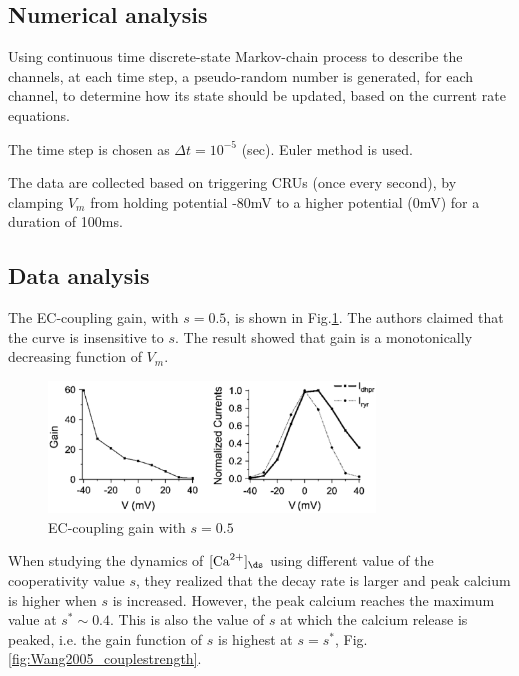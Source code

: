 \subsection{Numerical analysis}

Using continuous time discrete-state Markov-chain process to describe the
channels, at each time step, a pseudo-random number is generated, for each
channel, to determine how its state should be updated, based on the current rate
equations. 

The time step is chosen as $\Delta t=10^{-5}$ (sec). Euler method is used. 

The data are collected based on triggering CRUs (once every second), by clamping
$V_m$ from holding potential -80mV to a higher potential (0mV) for a duration of
100ms. 

\subsection{Data analysis}

The EC-coupling gain, with $s=0.5$, is shown in Fig.\ref{fig:Wang2005_ECgain}.
The authors claimed that the curve is insensitive to $s$. The result showed that
gain is a monotonically decreasing function of $V_m$.

\begin{figure}[hbt]
  \centerline{\includegraphics[height=3.5cm]{./images/Wang2005_ECgain.eps}}
\caption{EC-coupling gain with $s=0.5$ }
\label{fig:Wang2005_ECgain}
\end{figure}

When studying the dynamics of $[\Ca]_\ds$ using different value of the
cooperativity value $s$, they realized that the decay rate is larger and peak
calcium is higher when $s$ is increased. However, the peak calcium reaches the
maximum value at $s^* \sim 0.4$. This is also the value of $s$ at which the
calcium release is peaked, i.e. the gain function of $s$ is highest at $s=s^*$,
Fig.\ref{fig:Wang2005_couplestrength}.

